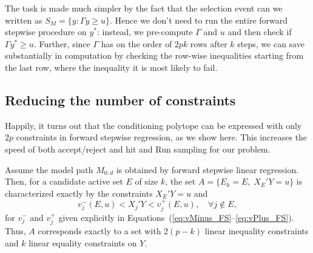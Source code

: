 \documentclass{article}
\begin{document}
The task is made much simpler by the fact that the selection event can we written as $S_M=\{y: \Gamma y \geq u\}$.
Hence we don't need to run the entire forward stepwise procedure on $y^*$: instead, we pre-compute $\Gamma$ and $u$ and then check
if $\Gamma y^* \geq u$. Further, since $\Gamma$ has on the  order of $2pk$ rows after $k$ steps,  we can save 
substantially in computation by checking the row-wise inequalities starting from the last row, where the inequality  it is most likely to fail.

\subsection{Reducing the number of constraints}
Happily, it turns out that the conditioning polytope can be expressed with only $2p$ constraints in forward stepwise regression, as we show here.
This increases the speed of both accept/reject and hit and Run sampling for our problem.

\begin{theorem}
  Assume the model path $M_{0:d}$ is obtained by forward stepwise 
  linear regression. Then, for a candidate active set $E$ of size $k$, 
  the set $A = \{E_k = E, \;X_E'Y = u\}$ is characterized 
  exactly by the constraints $X_E'Y=u$ and
  \[
  v_j^-(E,u) < X_j'Y < v_j^+(E,u), \quad\forall j \notin E,
  \]
  for $v_j^-$ and $v_j^+$ given explicitly in
  Equations~(\ref{eq:vMinus_FS}--\ref{eq:vPlus_FS}).
  Thus, $A$ corresponds exactly to 
  a set with $2(p-k)$ linear inequality constraints and $k$
  linear equality constraints on $Y$.
\end{theorem}
\end{document}
